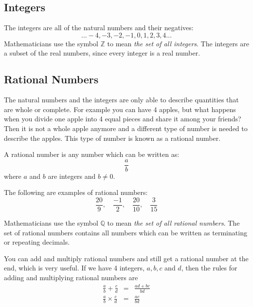 \documentclass[10pt,a4paper,titlepage,twoside,openright]{report}
\begin{document}
\subsection{Integers}
\label{mfoundation:i}
The integers are all of the natural numbers and their negatives:
\begin{equation}
\label{eq:mfoundation:nm:int}
\ldots-4, -3, -2, -1, 0, 1, 2, 3, 4\ldots
\end{equation}
Mathematicians use the symbol $\mathbb Z$ to mean \textit{the set of all
integers}. The integers are a subset of the real numbers, since every integer is
a real number.

\subsection{Rational Numbers}
\label{mfoundation:r}
The natural numbers and the integers are only able to describe quantities that
are whole or complete. For example you can have 4 apples, but what happens when
you divide one apple into 4 equal pieces and share it among your friends? Then
it is not a whole apple anymore and a different type of number is needed to
describe the apples. This type of number is known as a rational number.

A rational number is any number which can be written as:
\begin{equation}
\label{eq:r:rational}
\frac{a}{b}
\end{equation}
where $a$ and $b$ are integers and $b\ne 0$.

The following are examples of rational numbers:
\begin{equation}
\label{eq:r:rationalexamples}
\frac{20}{9}, \quad \frac{-1}{2}, \quad \frac{20}{10}, \quad \frac{3}{15}
\end{equation}



Mathematicians use the symbol $\mathbb Q$ to mean \textit{the set of all
rational numbers}. The set of rational numbers contains all numbers which can be
written as terminating or repeating decimals. 


You can add and multiply rational numbers and still get a rational number at the
end, which is very useful. If we have 4 integers, $a, b, c$ and $d$, then the
rules for adding and multiplying rational numbers are
\begin{eqnarray}
\label{eq:mfoundation:r:add}
\frac ab + \frac cd &=& \frac{ad+bc}{bd}\\
\label{eq:mfoundation:r:mult}
\frac ab \times \frac cd &=& \frac{ac}{bd}
\end{eqnarray}
\end{document}
